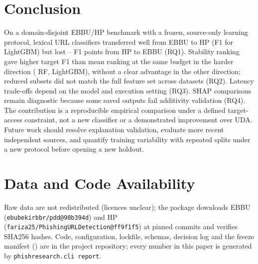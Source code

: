\section{Conclusion}
On a domain-disjoint EBBU/HP benchmark with a frozen, source-only learning protocol, lexical URL classifiers transferred well from EBBU to HP (F1  for LightGBM) but lost -- F1 points from HP to EBBU (RQ1). Stability ranking gave higher target F1 than mean ranking at the same budget in the harder direction ( RF,  LightGBM), without a clear advantage in the other direction; reduced subsets did not match the full feature set across datasets (RQ2). Latency trade-offs depend on the model and execution setting (RQ3). SHAP comparisons remain diagnostic because some saved outputs fail additivity validation (RQ4). The contribution is a reproducible empirical comparison under a defined target-access constraint, not a new classifier or a demonstrated improvement over UDA. Future work should resolve explanation validation, evaluate more recent independent sources, and quantify training variability with repeated splits under a new protocol before opening a new holdout.

\section*{Data and Code Availability}
Raw data are not redistributed (licences unclear); the package downloads EBBU (\texttt{ebubekirbbr/pdd@90b394d}) and HP (\texttt{fariza25/PhishingURLDetection@ff9f1f5}) at pinned commits and verifies SHA256 hashes. Code, configuration, lockfile, schemas, decision log and the freeze manifest (\texttt{}) are in the project repository; every number in this paper is generated by \texttt{phishresearch.cli report}.
